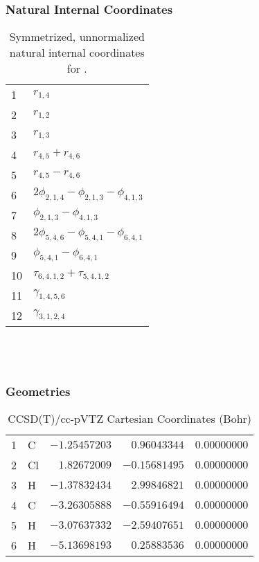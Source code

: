 \documentclass[10pt,oneside]{article}
\begin{document}
\subsubsection*{Natural Internal Coordinates}
\begin{table}[h!]
\centering
\caption{Symmetrized, unnormalized natural internal coordinates for .}
\small
\begin{tabular}{ll}
  1   & $r_{1,4}$ \\
  2   & $r_{1,2}$ \\
  3   & $r_{1,3}$ \\
  4   & $r_{4,5} + r_{4,6}$ \\
  5   & $r_{4,5} - r_{4,6}$ \\
  6   & $2\phi_{2,1,4} - \phi_{2,1,3} - \phi_{4,1,3}$ \\
  7   & $\phi_{2,1,3} - \phi_{4,1,3}$ \\
  8   & $2\phi_{5,4,6} - \phi_{5,4,1} - \phi_{6,4,1}$ \\
  9   & $\phi_{5,4,1} - \phi_{6,4,1}$ \\
  10  & $\tau_{6,4,1,2} + \tau_{5,4,1,2}$ \\
  11  & $\gamma_{1,4,5,6}$ \\
  12  & $\gamma_{3,1,2,4}$ \\
\end{tabular}
\end{table}

\clearpage

\subsection{\ \ \ }

\subsubsection*{Geometries}
\begin{table}[h!]
\centering
\caption{CCSD(T)/cc-pVTZ Cartesian Coordinates (Bohr)}
\begin{tabular}{llrrr}
1  & C  & $-1.25457203$ & $ 0.96043344$ & $ 0.00000000$ \\
2  & Cl & $ 1.82672009$ & $-0.15681495$ & $ 0.00000000$ \\
3  & H  & $-1.37832434$ & $ 2.99846821$ & $ 0.00000000$ \\
4  & C  & $-3.26305888$ & $-0.55916494$ & $ 0.00000000$ \\
5  & H  & $-3.07637332$ & $-2.59407651$ & $ 0.00000000$ \\
6  & H  & $-5.13698193$ & $ 0.25883536$ & $ 0.00000000$ \\
\end{tabular}
\end{table}
\end{document}
